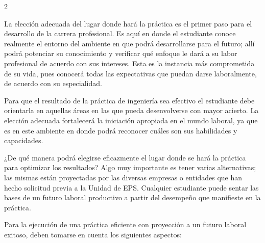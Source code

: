 \documentclass[11pt,spanish,Letterpaper,openany]{book}
\begin{document}
\begin {multicols}{2}

La elección adecuada del lugar donde hará la práctica es el primer paso para el desarrollo de la carrera profesional. Es aquí en donde el estudiante conoce realmente el entorno del ambiente en que podrá desarrollarse para el futuro; allí podrá potenciar su conocimiento y verificar qué enfoque le dará a su labor profesional de acuerdo con sus intereses. Esta es la instancia más comprometida de su vida, pues conocerá todas las expectativas que puedan darse laboralmente, de acuerdo con su especialidad.

Para que el resultado de la práctica de ingeniería sea efectivo el estudiante debe orientarla en aquellas áreas en las que pueda desenvolverse con mayor acierto. La elección adecuada fortalecerá la iniciación apropiada en el mundo laboral, ya que es en este ambiente en donde podrá reconocer cuáles son sus habilidades y capacidades.

¿De qué manera podrá elegirse eficazmente el lugar donde se hará la práctica para optimizar los resultados? Algo muy importante es tener varias alternativas; las mismas están proyectadas por las diversas empresas o entidades que han hecho solicitud previa a la Unidad de EPS. Cualquier estudiante puede sentar las bases de un futuro laboral productivo a partir del desempeño que manifieste en la práctica.

Para la ejecución de una práctica eficiente con proyección a un futuro laboral exitoso, deben tomarse en cuenta los siguientes aspectos:


\end{multicols}
\end{document}
